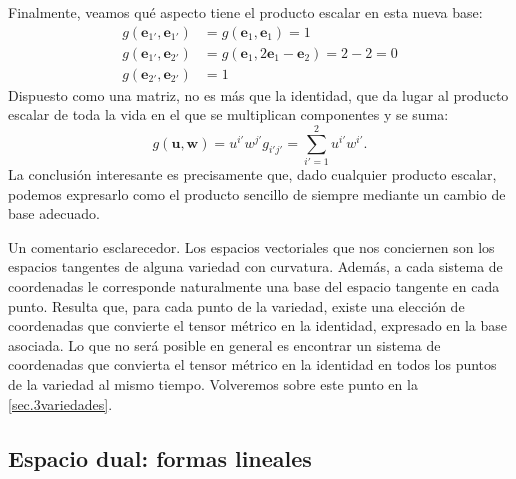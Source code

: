 \begin{example}
    Finalmente, veamos qué aspecto tiene el producto escalar en esta nueva base:
    \begin{align*}
        g(\mathbf{e}_{1'},\mathbf{e}_{1'}) &= g(\mathbf{e}_{1},\mathbf{e}_{1}) = 1\\
        g(\mathbf{e}_{1'},\mathbf{e}_{2'}) &= g(\mathbf{e}_{1},2\mathbf{e}_{1} - \mathbf{e}_2) = 2 - 2 = 0\\
        g(\mathbf{e}_{2'},\mathbf{e}_{2'}) &= 1
    \end{align*}
    Dispuesto como una matriz, no es más que la identidad, que da lugar al producto escalar de toda la vida en el que se multiplican componentes y se suma:
    \begin{equation*}
        g(\mathbf{u},\mathbf{w}) = u^{i'}w^{j'} g_{i'j'} = \sum_{i'=1}^2 u^{i'}w^{i'}.
    \end{equation*}
    La conclusión interesante es precisamente que, dado cualquier producto escalar, podemos expresarlo como el producto sencillo de siempre mediante un cambio de base adecuado. 
    
    Un comentario esclarecedor. Los espacios vectoriales que nos conciernen son los espacios tangentes de alguna variedad con curvatura. Además, a cada sistema de coordenadas le corresponde naturalmente una base del espacio tangente en cada punto. Resulta que, para cada punto de la variedad, existe una elección de coordenadas que convierte el tensor métrico en la identidad, expresado en la base asociada. Lo que no será posible en general es encontrar un sistema de coordenadas que convierta el tensor métrico en la identidad en todos los puntos de la variedad al mismo tiempo. Volveremos sobre este punto en la \cref{sec.3variedades}.
\end{example}

\subsection{Espacio dual: formas lineales}
\label{subsec.2formaslineales}

